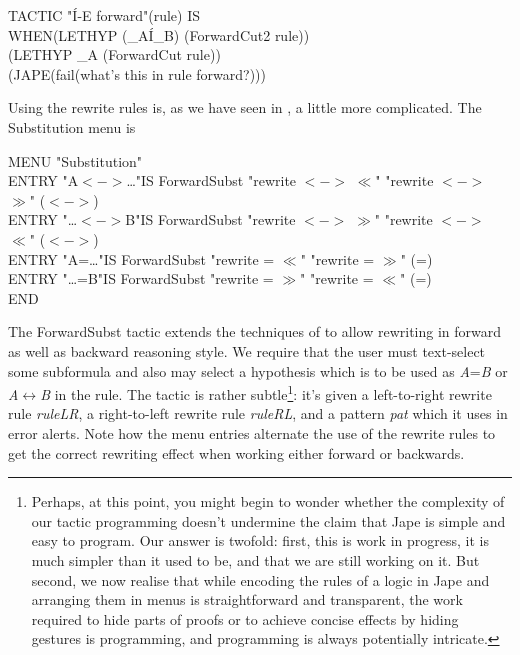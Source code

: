 TACTIC "\'{I}-E forward"(rule) IS\\
\tab WHEN\tab (LETHYP (\_A\'{I}\_B) (ForwardCut2 rule))\\
\tab \tab (LETHYP \_A (ForwardCut rule))\\
\tab \tab (JAPE(fail(what's this in rule forward?)))


Using the rewrite rules is, as we have seen in , a little more complicated. The Substitution menu is

MENU "Substitution"\\
\tab ENTRY "A$<->$\dots "\tab IS ForwardSubst "rewrite $<->$ $\ll$" "rewrite $<->$ $\gg$" ($<->$)\\
\tab ENTRY "\dots $<->$B"\tab IS ForwardSubst "rewrite $<->$ $\gg$" "rewrite $<->$ $\ll$" ($<->$)\\
\tab ENTRY "A=\dots "\tab IS ForwardSubst "rewrite = $\ll$" "rewrite = $\gg$" (=)\\
\tab ENTRY "\dots =B"\tab IS ForwardSubst "rewrite = $\gg$" "rewrite = $\ll$" (=)\\
END


The ForwardSubst tactic extends the techniques of  to allow rewriting in forward as well as backward reasoning style. We require that the user must text-select some subformula and also may select a hypothesis which is to be used as \textit{A}=\textit{B} or \textit{A}\ensuremath{\leftrightarrow}\textit{B} in the rule. The tactic is rather subtle\footnote{Perhaps, at this point, you might begin to wonder whether the complexity of our tactic programming doesn't undermine the claim that Jape is simple and easy to program. Our answer is twofold: first, this is work in progress, it is much simpler than it used to be, and that we are still working on it. But second, we now realise that while encoding the rules of a logic in Jape and arranging them in menus is straightforward and transparent, the work required to hide parts of proofs or to achieve concise effects by hiding gestures is programming, and programming is always potentially intricate.}: it's given a left-to-right rewrite rule \textit{ruleLR}, a right-to-left rewrite rule \textit{ruleRL}, and a pattern \textit{pat} which it uses in error alerts. Note how the menu entries alternate the use of the rewrite rules to get the correct rewriting effect when working either forward or backwards.


